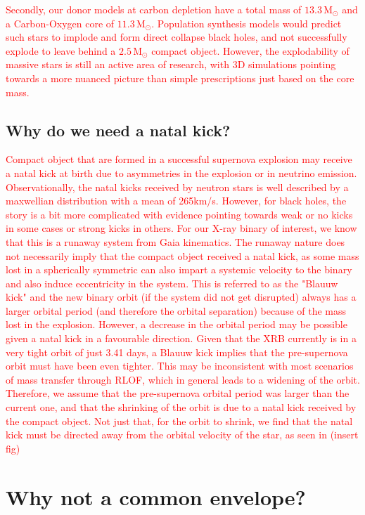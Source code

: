 \documentclass[linenumbers,trackchanges,twocolumn]{aastex701}
\newcommand{\Mdot}{\mathrm{M}_{\odot}}
\newcommand{\red}{\textcolor{red}}
\begin{document}
\red{Secondly, our donor models at carbon depletion have a total mass of $13.3\,\Mdot$ and a Carbon-Oxygen core of $11.3\,\Mdot$. Population synthesis models would predict such stars to implode and form direct collapse black holes, and not successfully explode to leave behind a $2.5\,\Mdot$ compact object. However, the explodability of massive stars is still an active area of research, with 3D simulations pointing towards a more nuanced picture than simple prescriptions just based on the core mass.} 

\subsection{Why do we need a natal kick?}

\red{Compact object that are formed in a successful supernova explosion may receive a natal kick at birth due to asymmetries in the explosion or in neutrino emission. Observationally, the natal kicks received by neutron stars is well described by a maxwellian distribution with a mean of 265km/s. However, for black holes, the story is a bit more complicated with evidence pointing towards weak or no kicks in some cases or strong kicks in others. For our X-ray binary of interest, we know that this is a runaway system from Gaia kinematics. The runaway nature does not necessarily imply that the compact object received a natal kick, as some mass lost in a spherically symmetric can also impart a systemic velocity to the binary and also induce eccentricity in the system. This is referred to as the "Blauuw kick" and the new binary orbit (if the system did not get disrupted) always has a larger orbital period (and therefore the orbital separation) because of the mass lost in the explosion. However, a decrease in the orbital period may be possible given a natal kick in a favourable direction. Given that the XRB currently is in a very tight orbit of just 3.41 days, a Blauuw kick implies that the pre-supernova orbit must have been even tighter. This may be inconsistent with most scenarios of mass transfer through RLOF, which in general leads to a widening of the orbit. Therefore, we assume that the pre-supernova orbital period was larger than the current one, and that the shrinking of the orbit is due to a natal kick received by the compact object. Not just that, for the orbit to shrink, we find that the natal kick must be directed away from the orbital velocity of the star, as seen in (insert fig)}

\section{Why not a common envelope?}
\end{document}
